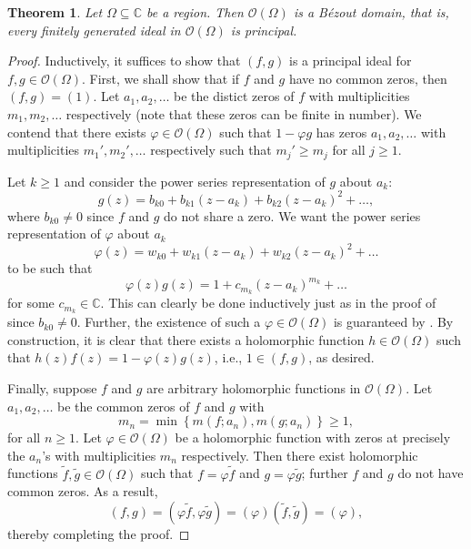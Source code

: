 \documentclass[11pt]{article}
\theoremstyle{thmstyle}
\newtheorem{theorem}{Theorem}[section]
\theoremstyle{defstyle}
\newcommand{\bbC}{\mathbb{C}}
\newcommand{\scrO}{\mathscr{O}} %
\newcommand{\wt}[1]{\widetilde{#1}}
\renewcommand{\ge}{\geqslant}
\begin{document}
\begin{theorem}
    Let $\Omega\subseteq\bbC$ be a region. Then $\scrO(\Omega)$ is a B\'ezout domain, that is, every finitely generated ideal in $\scrO(\Omega)$ is principal.
\end{theorem}
\begin{proof}
    Inductively, it suffices to show that $(f, g)$ is a principal ideal for $f, g\in\scrO(\Omega)$. First, we shall show that if $f$ and $g$ have no common zeros, then $(f, g) = (1)$. Let $a_1,a_2,\dots$ be the distict zeros of $f$ with multiplicities $m_1, m_2,\dots$ respectively (note that these zeros can be finite in number). We contend that there exists $\varphi\in\scrO(\Omega)$ such that $1 - \varphi g$ has zeros $a_1, a_2, \dots$ with multiplicities $m_1', m_2',\dots$ respectively such that $m_j'\ge m_j$ for all $j\ge 1$.

    Let $k\ge 1$ and consider the power series representation of $g$ about $a_k$: 
    \begin{equation*}
        g(z) = b_{k0} + b_{k1}(z - a_k) + b_{k2}(z - a_k)^2 + \dots,
    \end{equation*}
    where $b_{k0}\ne 0$ since $f$ and $g$ do not share a zero. We want the power series representation of $\varphi$ about $a_k$ 
    \begin{equation*}
        \varphi(z) = w_{k0} + w_{k1}(z - a_k) + w_{k2}(z - a_k)^2 + \dots
    \end{equation*}
    to be such that 
    \begin{equation*}
        \varphi(z)g(z) = 1 + c_{m_k}(z - a_k)^{m_k} + \dots 
    \end{equation*}
    for some $c_{m_k}\in\bbC$. This can clearly be done inductively just as in the proof of  since $b_{k0}\ne 0$. Further, the existence of such a $\varphi\in\scrO(\Omega)$ is guaranteed by . By construction, it is clear that there exists a holomorphic function $h\in\scrO(\Omega)$ such that $h(z)f(z) = 1 - \varphi(z)g(z)$, i.e., $1\in (f, g)$, as desired.

    Finally, suppose $f$ and $g$ are arbitrary holomorphic functions in $\scrO(\Omega)$. Let $a_1,a_2,\dots$ be the common zeros of $f$ and $g$ with 
    \begin{equation*}
        m_n = \min\left\{m(f; a_n), m(g; a_n)\right\}\ge 1,
    \end{equation*}
    for all $n\ge 1$. Let $\varphi\in\scrO(\Omega)$ be a holomorphic function with zeros at precisely the $a_n$'s with multiplicities $m_n$ respectively. Then there exist holomorphic functions $\wt f, \wt g\in\scrO(\Omega)$ such that $f = \varphi\wt f$ and $g = \varphi\wt g$; further $f$ and $g$ do not have common zeros. As a result, 
    \begin{equation*}
        (f, g) = (\varphi\wt f, \varphi\wt g) = (\varphi)(\wt f, \wt g) = (\varphi),
    \end{equation*}
    thereby completing the proof.
\end{proof}
\end{document}
